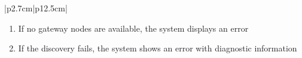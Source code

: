 \begin{table}[H]
\begin{tabular}{|p{2.7cm}|p{12.5cm}|}
\begin{minipage}[t]{\linewidth}
                                      \begin{enumerate}[topsep=0pt,itemsep=1pt,parsep=0pt,partopsep=0pt]
                                          \item If no gateway nodes are available, the system displays an error
                                          \item If the discovery fails, the system shows an error with diagnostic information
                                      \end{enumerate}
                                  \end{minipage} \\
        \hline
    \end{tabular}
    \label{tab:admin-discover-hardware}
\end{table}

